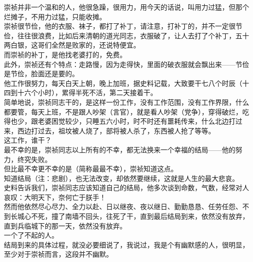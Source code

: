\begin{multicols}{\theparacolNo}
崇祯并非一个温和的人，他很急躁，很用力，用今天的话说，叫用力过猛，但那个烂摊子，不用力过猛，只能收摊。\\

崇祯很节俭，他的衣服、袜子，都打了补丁，请注意，打补丁的，并不一定很节俭，往往很浪费，比如后来清朝的道光同志，衣服破了，让人去打了个补丁，五十两白银，这哥们全然是败家的，还说特便宜。\\

而崇祯的补丁，是他找老婆打的，免费。\\

此外，崇祯还有个特点：走路慢，因为走得快，里面的破衣服就会飘出来——节俭是节俭，脸面还是要的。\\

他工作很努力，每天白天上朝，晚上加班，据史料记载，大致要干七八个时辰（十四到十六个小时），累得半死不活，第二天接着干。\\

简单地说，崇祯同志干的，是这样一份工作，没有工作范围，没有工作界限，什么都要管，每天上班，不是跟人吵架（言官），就是看人吵架（党争），穿得破烂，吃得也少，跟老婆困觉较少，只睡五六小时，时不时还有噩耗传来，什么北边打过来，西边打过去，祖坟被人烧了，部将被人杀了，东西被人抢了等等。\\

这工作，谁干？\\

最不幸的是，崇祯同志以上所有的不幸，都无法换来一个幸福的结局——他的努力，终究失败。\\

但比最不幸更不幸的是（简称最最不幸），崇祯知道这点。\\

知道结局（注：悲剧），也无法改变，却依然要继续，这就是人生的最大悲哀。\\

史料告诉我们，崇祯同志应该知道自己的结局，他多次谈到命数，气数，经常对人哀叹：大明天下，奈何亡于朕手！\\

然而他依然尽心尽力、全力以赴、日以继夜、夜以继日、勤勤恳恳、任劳任怨、不到长城心不死，撞了南墙不回头，往死了干，直到最后结局到来，依然没有放弃，直到兵临城下的那一天，依然没有放弃。\\

一个了不起的人。\\

结局到来的具体过程，就没必要细说了，我说过，我是个有幽默感的人，很明显，至少对于崇祯而言，这段并不幽默。\\


\end{multicols}
